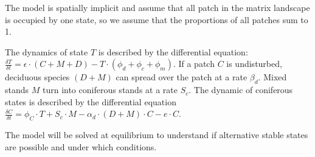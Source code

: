 The model is spatially implicit and assume that all patch in the matrix
landscape is occupied by one state, so we assume that the proportions of all
patches sum to 1.






The dynamics of state $T$ is described by the differential equation:
$\frac{\delta T}{\delta t} = \epsilon \cdot (C+M+D) - T \cdot (\phi_d + \phi_c +
\phi_m)$. If a patch $C$ is undisturbed, deciduous species $(D+M)$ can spread
over the patch at a rate $\beta_d$. Mixed stands $M$ turn into coniferous
stands at a rate $S_c$.  The dynamic of coniferous states is described by the
differential equation $\frac{\delta C}{\delta t} = \phi_C \cdot T + S_c \cdot
M - \alpha_d \cdot (D+M)\cdot C - e \cdot C$. 




The model will be solved at equilibrium to understand if alternative
stable states are possible and under which conditions.\\


